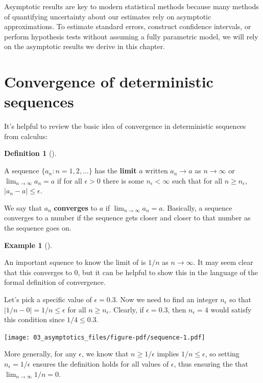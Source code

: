 \documentclass[
  letterpaper,
  DIV=11,
  numbers=noendperiod]{scrreprt}
\theoremstyle{definition}
\newtheorem{example}{Example}[chapter]
\theoremstyle{definition}
\newtheorem{definition}{Definition}[chapter]
\theoremstyle{plain}
\theoremstyle{remark}
\begin{document}
Asymptotic results are key to modern statistical methods because many
methods of quantifying uncertainty about our estimates rely on
asymptotic approximations. To estimate standard errors, construct
confidence intervals, or perform hypothesis tests without assuming a
fully parametric model, we will rely on the asymptotic results we derive
in this chapter.

\hypertarget{convergence-of-deterministic-sequences}{%
\section{Convergence of deterministic
sequences}\label{convergence-of-deterministic-sequences}}

It's helpful to review the basic idea of convergence in deterministic
sequences from calculus:

\begin{definition}[]\protect\hypertarget{def-limit}{}\label{def-limit}

A sequence \(\{a_n: n = 1, 2, \ldots\}\) has the \textbf{limit} \(a\)
written \(a_n \rightarrow a\) as \(n\rightarrow \infty\) or
\(\lim_{n\rightarrow \infty} a_n = a\) if for all \(\epsilon > 0\) there
is some \(n_{\epsilon} < \infty\) such that for all
\(n \geq n_{\epsilon}\), \(|a_n - a| \leq \epsilon\).

\end{definition}

We say that \(a_n\) \textbf{converges} to \(a\) if
\(\lim_{n\rightarrow\infty} a_n = a\). Basically, a sequence converges
to a number if the sequence gets closer and closer to that number as the
sequence goes on.

\begin{example}[]\protect\hypertarget{exm-limit}{}\label{exm-limit}

An important squence to know the limit of is \(1/n\) as \(n\to\infty\).
It may seem clear that this converges to 0, but it can be helpful to
show this in the language of the formal definition of convergence.

Let's pick a specific value of \(\epsilon = 0.3\). Now we need to find
an integer \(n_{\epsilon}\) so that \(|1/n - 0| = 1/n \leq \epsilon\)
for all \(n \geq n_{\epsilon}\). Clearly, if \(\epsilon = 0.3\), then
\(n_{\epsilon} = 4\) would satisfy this condition since
\(1/4 \leq 0.3\).

\texttt{[image: 03\_asymptotics\_files/figure-pdf/sequence-1.pdf]}

More generally, for any \(\epsilon\), we know that \(n \geq 1/\epsilon\)
implies \(1/n \leq \epsilon\), so setting \(n_{\epsilon} = 1/\epsilon\)
ensures the definition holds for all values of \(\epsilon\), thus
ensuring the that \(\lim_{n\to\infty} 1/n = 0\).

\end{example}
\end{document}
